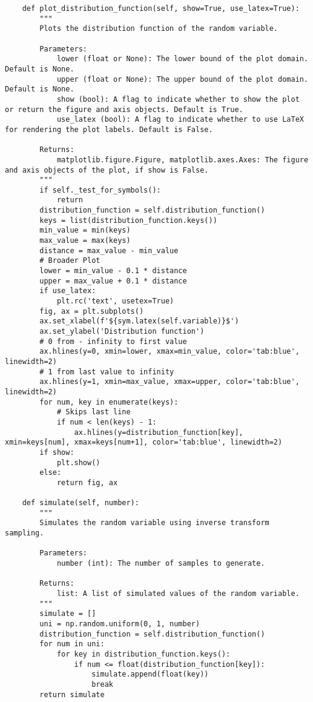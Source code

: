 \begin{small}
\begin{lstlisting}
    def plot_distribution_function(self, show=True, use_latex=True):
        """
        Plots the distribution function of the random variable.

        Parameters:
            lower (float or None): The lower bound of the plot domain. Default is None.
            upper (float or None): The upper bound of the plot domain. Default is None.
            show (bool): A flag to indicate whether to show the plot or return the figure and axis objects. Default is True.
            use_latex (bool): A flag to indicate whether to use LaTeX for rendering the plot labels. Default is False.

        Returns:
            matplotlib.figure.Figure, matplotlib.axes.Axes: The figure and axis objects of the plot, if show is False.
        """
        if self._test_for_symbols():
            return
        distribution_function = self.distribution_function()
        keys = list(distribution_function.keys())
        min_value = min(keys)
        max_value = max(keys)
        distance = max_value - min_value
        # Broader Plot
        lower = min_value - 0.1 * distance
        upper = max_value + 0.1 * distance
        if use_latex:
            plt.rc('text', usetex=True)
        fig, ax = plt.subplots()
        ax.set_xlabel(f'${sym.latex(self.variable)}$')
        ax.set_ylabel('Distribution function')
        # 0 from - infinity to first value
        ax.hlines(y=0, xmin=lower, xmax=min_value, color='tab:blue', linewidth=2)
        # 1 from last value to infinity
        ax.hlines(y=1, xmin=max_value, xmax=upper, color='tab:blue', linewidth=2)
        for num, key in enumerate(keys):
            # Skips last line
            if num < len(keys) - 1:
                ax.hlines(y=distribution_function[key], xmin=keys[num], xmax=keys[num+1], color='tab:blue', linewidth=2)
        if show:
            plt.show()
        else:
            return fig, ax

    def simulate(self, number):
        """
        Simulates the random variable using inverse transform sampling.

        Parameters:
            number (int): The number of samples to generate.

        Returns:
            list: A list of simulated values of the random variable.
        """
        simulate = []
        uni = np.random.uniform(0, 1, number)
        distribution_function = self.distribution_function()
        for num in uni:
            for key in distribution_function.keys():
                if num <= float(distribution_function[key]):
                    simulate.append(float(key))
                    break
        return simulate
\end{lstlisting}
\end{small}


